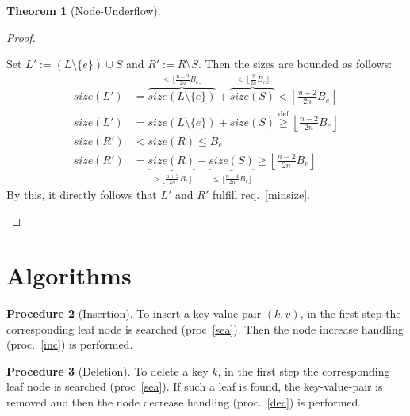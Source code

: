 \documentclass[a4paper, 8pt, twoclumn]{scrartcl}
\theoremstyle{plain}
\theoremstyle{definition}
\newtheorem{thm}{Theorem}[section]
\newtheorem{proc}[thm]{Procedure}
\theoremstyle{remark}
\newcommand{\Beff}{B_e}
\newcommand{\Lfloor}{\left\lfloor}
\newcommand{\Rfloor}{\right\rfloor}
\begin{document}
\begin{multicols}{2}
\begin{thm}[Node-Underflow]
\begin{proof}
\begin{enumerate}
Set \mbox{$L' := (L \setminus \{e\}) \cup S$} and \mbox{$R' := R \setminus S$}.
Then the sizes are bounded as follows:
\begin{align*}
size(L') &= \overbrace{size(L \setminus \{e\})}^{
			< \lfloor \frac{n-2}{2n} \Beff \rfloor}
		+ \overbrace{size(S)}^{< \lfloor \frac{2}{2n} \Beff \rfloor}
	< \Lfloor \tfrac{n+2}{2n} \Beff \Rfloor\\
size(L') &= size(L \setminus \{e\}) + size(S)
	\stackrel{\mathrm{def}}{\geq} \Lfloor \tfrac{n-2}{2n} \Beff \Rfloor\\
size(R') &< size(R) \leq \Beff\\
size(R') &= \underbrace{size(R)}_{> \lfloor \frac{n+2}{2n} \Beff \rfloor}
		- \underbrace{size(S)}_{\leq \lfloor \frac{n-4}{2n} \Beff \rfloor}
	\geq \Lfloor \tfrac{n-2}{2n} \Beff \Rfloor
\end{align*}
By this, it directly follows that $L'$ and $R'$ fulfill req.~\ref{minsize}.
\end{enumerate}
\end{proof}
\end{thm}



\section{Algorithms} %

\begin{proc}[Insertion] \label{ins}
To insert a key-value-pair \mbox{$(k, v)$}, in the first step the corresponding
leaf node is searched (proc~\ref{sea}).
Then the node increase handling (proc.~\ref{inc}) is performed.
\end{proc}


\begin{proc}[Deletion] \label{del}
To delete a key $k$, in the first step the corresponding
leaf node is searched (proc~\ref{sea}).
If such a leaf is found, the key-value-pair is removed and then the node
decrease handling (proc.~\ref{dec}) is performed.
\end{proc}



\end{multicols}
\end{document}
